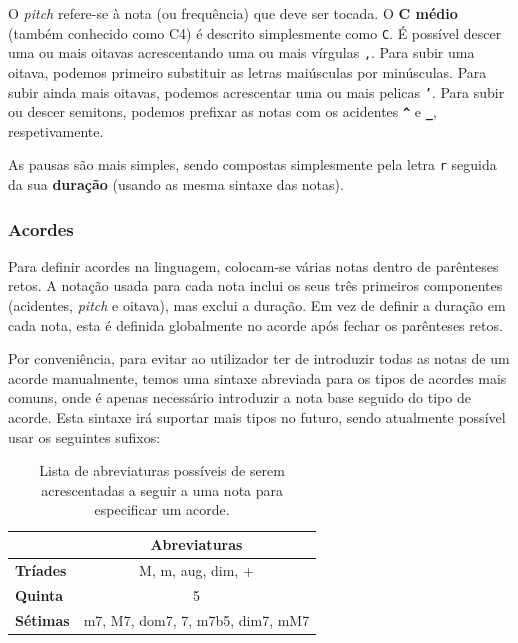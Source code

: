 O \textit{pitch} refere-se à nota (ou frequência) que deve ser tocada. O \textbf{C médio} (também conhecido como C4) é descrito simplesmente como \texttt{C}. É possível descer uma ou mais oitavas acrescentando uma ou mais vírgulas \texttt{,}. Para subir uma oitava, podemos primeiro substituir as letras maiúsculas por minúsculas. Para subir ainda mais oitavas, podemos acrescentar uma ou mais pelicas \texttt{'}. Para subir ou descer semitons, podemos prefixar as notas com os acidentes \textbf{\texttt{\textasciicircum{}}} e \textbf{\texttt{\_}}, respetivamente.

As pausas são mais simples, sendo compostas simplesmente pela letra \texttt{r} seguida da sua \textbf{duração} (usando as mesma sintaxe das notas).

\subsubsection{\textbf{Acordes}}
Para definir acordes na linguagem, colocam-se várias notas dentro de parênteses retos. A notação usada para cada nota inclui os seus três primeiros componentes (acidentes, \textit{pitch} e oitava), mas exclui a duração. Em vez de definir a duração em cada nota, esta é definida globalmente no acorde após fechar os parênteses retos.

Por conveniência, para evitar ao utilizador ter de introduzir todas as notas de um acorde manualmente, temos uma sintaxe abreviada para os tipos de acordes mais comuns, onde é apenas necessário introduzir a nota base seguido do tipo de acorde. Esta sintaxe irá suportar mais tipos no futuro, sendo atualmente possível usar os seguintes sufixos:

\begin{table}[h]
\centering
\def\arraystretch{1.3}
\begin{tabular}{|l|c|}
\hline
\textbf{}        & \textbf{Abreviaturas}           \\ \hline
\textbf{Tríades} & M, m, aug, dim, +                \\ \hline
\textbf{Quinta}  & 5                                \\ \hline
\textbf{Sétimas} & m7, M7, dom7, 7, m7b5, dim7, mM7 \\ \hline
\end{tabular}
\caption{Lista de abreviaturas possíveis de serem acrescentadas a seguir a uma nota para especificar um acorde.}
\label{tab:modifiers-list}
\end{table}

